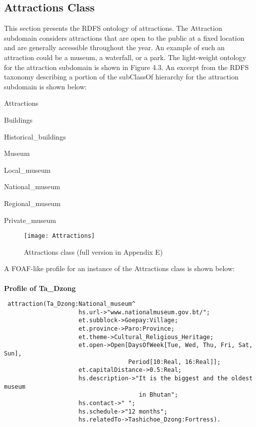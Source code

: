\subsection{Attractions Class}

\hspace{0.3in}This section presents the RDFS ontology of attractions. The Attraction subdomain considers attractions that are open to the public at a fixed location and are generally accessible throughout the year. An example of such an attraction could be a museum, a waterfall, or a park. The light-weight ontology for the attraction subdomain is shown in Figure 4.3. An excerpt from the RDFS taxonomy describing a portion of the subClassOf hierarchy for the attraction subdomain is shown below:

\singlespacing
Attractions

\hspace{10mm}Buildings

\hspace{20mm}Historical\_buildings

\hspace{30mm}Museum

\hspace{40mm}Local\_museum

\hspace{40mm}National\_museum

\hspace{40mm}Regional\_museum

\hspace{40mm}Private\_museum


\doublespacing

\begin{figure}
\begin{center}
\texttt{[image: Attractions]}
\caption {Attractions class (full version in Appendix E)}
\label{fig:Fig4.3}
\end{center}
\end{figure}


A FOAF-like profile for an instance of the Attractions class is shown below:
\\
\\

\textbf{Profile of Ta\_Dzong}

\begin{small}
\singlespacing
\begin{verbatim}
 attraction(Ta_Dzong:National_museum^
                     hs.url->"www.nationalmuseum.gov.bt/";
                     et.subblock->Goepay:Village;
                     et.province->Paro:Province;
                     et.theme->Cultural_Religious_Heritage;
                     et.open->Open[DaysOfWeek[Tue, Wed, Thu, Fri, Sat, Sun],
                                   Period[10:Real, 16:Real]];
                     et.capitalDistance->0.5:Real;
                     hs.description->"It is the biggest and the oldest museum
                                      in Bhutan";
                     hs.contact->" ";
                     hs.schedule->"12 months";
                     hs.relatedTo->Tashichoe_Dzong:Fortress).   
\end{verbatim}
\end{small}

